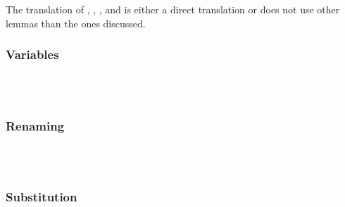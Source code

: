 \noindent The translation of , , ,  and  is either a direct translation or does not use other lemmas than the ones discussed.

\subsubsection{Variables}\hfill\\\\
\DPTVarPresLookup
\DPTOVarPresLookup
\subsubsection{Renaming}\hfill\\\\
\DPTVarPresRen
\DPTTypePresRen
\DPTTypePresWk
\DPTTypePresWkInst
\subsubsection{Substitution}\hfill\\\\
\DPTVarPresSub
\DPTTypePresSub
\DPTTypePresSingleSub